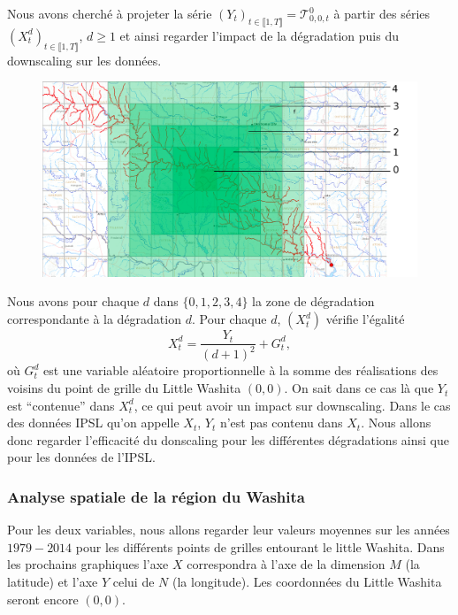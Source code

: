 \documentclass[a4paper,11pt]{article}
\numberwithin{equation}{section}
\begin{document}
Nous avons cherché à projeter la série $(Y_t)_{t \in \llbracket 1,T \rrbracket}= \mathcal{T}^{0}_{0,0,t}$ à partir des séries $(X^d_t)_{t\in \llbracket 1,T \rrbracket}$, $d\geq 1$ et ainsi regarder l'impact de la dégradation puis du downscaling sur les données.

\begin{figure}[H]
	\begin{center}
		\includegraphics[scale=0.3]{Little_Washita_deg.png}
	\end{center}
	\label{fig-Little-Washita-deg}
\end{figure}

Nous avons pour chaque $d$ dans $\{0,1,2,3,4\}$ la zone de dégradation correspondante à la dégradation $d$. Pour chaque $d$, $(X^d_t)$ vérifie l'égalité 
\[X^d_t=\frac{Y_t}{(d+1)^2}+ G^d_t,\]
où $G^d_t$ est une variable aléatoire proportionnelle à la somme des réalisations des voisins du point de grille du Little Washita $(0,0)$. On sait dans ce cas là que $Y_t$ est ``contenue'' dans $X^d_t$, ce qui peut avoir un impact sur downscaling. Dans le cas des données IPSL qu'on appelle $X_t$, $Y_t$ n'est pas contenu dans $X_t$. Nous allons donc regarder l'efficacité du donscaling pour les différentes dégradations ainsi que pour les données de l'IPSL.

\subsubsection{Analyse spatiale de la région du Washita}
\label{ch:analyse spatiale Washita}

Pour les deux variables, nous allons regarder leur valeurs moyennes sur les années $1979-2014$ pour les différents points de grilles entourant le little Washita. Dans les prochains graphiques l'axe $X$ correspondra à l'axe de la dimension $M$ (la latitude) et l'axe $Y$ celui de $N$ (la longitude). Les coordonnées du Little Washita seront encore $(0,0)$.
\end{document}
